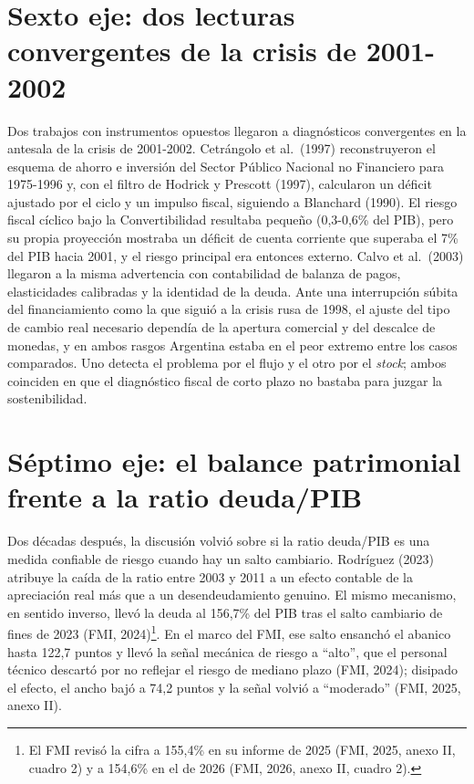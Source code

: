 \section{Sexto eje: dos lecturas convergentes de la crisis de 2001-2002}

Dos trabajos con instrumentos opuestos llegaron a diagnósticos
convergentes en la antesala de la crisis de 2001-2002. Cetrángolo et
al.~(1997) reconstruyeron el esquema de ahorro e inversión del Sector
Público Nacional no Financiero para 1975-1996 y, con el filtro de
Hodrick y Prescott (1997), calcularon un déficit ajustado por el ciclo y
un impulso fiscal, siguiendo a Blanchard (1990). El riesgo fiscal
cíclico bajo la Convertibilidad resultaba pequeño (0,3-0,6\% del PIB),
pero su propia proyección mostraba un déficit de cuenta corriente que
superaba el 7\% del PIB hacia 2001, y el riesgo principal era entonces
externo. Calvo et al.~(2003) llegaron a la misma advertencia con
contabilidad de balanza de pagos, elasticidades calibradas y la
identidad de la deuda. Ante una interrupción súbita del financiamiento
como la que siguió a la crisis rusa de 1998, el ajuste del tipo de
cambio real necesario dependía de la apertura comercial y del descalce
de monedas, y en ambos rasgos Argentina estaba en el peor extremo entre
los casos comparados. Uno detecta el problema por el flujo y el otro por
el \emph{stock}; ambos coinciden en que el diagnóstico fiscal de corto
plazo no bastaba para juzgar la sostenibilidad.

\section{Séptimo eje: el balance patrimonial frente a la ratio
deuda/PIB}

Dos décadas después, la discusión volvió sobre si la ratio deuda/PIB es
una medida confiable de riesgo cuando hay un salto cambiario. Rodríguez
(2023) atribuye la caída de la ratio entre 2003 y 2011 a un efecto
contable de la apreciación real más que a un desendeudamiento genuino.
El mismo mecanismo, en sentido inverso, llevó la deuda al 156,7\% del
PIB tras el salto cambiario de fines de 2023 (FMI, 2024)\footnote{El FMI
  revisó la cifra a 155,4\% en su informe de 2025 (FMI, 2025, anexo II,
  cuadro 2) y a 154,6\% en el de 2026 (FMI, 2026, anexo II, cuadro 2).}.
En el marco del FMI, ese salto ensanchó el abanico hasta 122,7 puntos y
llevó la señal mecánica de riesgo a ``alto'', que el personal técnico
descartó por no reflejar el riesgo de mediano plazo (FMI, 2024);
disipado el efecto, el ancho bajó a 74,2 puntos y la señal volvió a
``moderado'' (FMI, 2025, anexo II).

